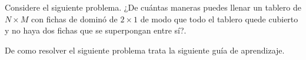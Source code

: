 Considere el siguiente problema. ¿De cuántas maneras puedes llenar un tablero de $N \times M$ con fichas de dominó de $2 \times 1$ de modo que todo el tablero quede cubierto y no haya dos fichas que se superpongan entre sí?. 

De como resolver el siguiente problema trata la siguiente guía de aprendizaje.

